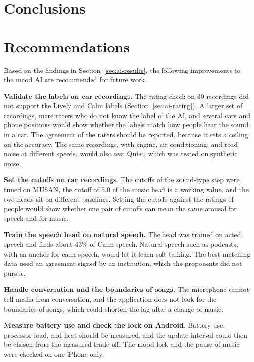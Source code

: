 \section{Conclusions}

\section{Recommendations}
\label{sec:recs}
Based on the findings in Section~\ref{sec:ai-results}, the following improvements to the mood AI are recommended for future work.

\textbf{Validate the labels on car recordings.} The rating check on 30 recordings did not support the Lively and Calm labels (Section~\ref{sec:ai-rating}). A larger set of recordings, more raters who do not know the label of the AI, and several cars and phone positions would show whether the labels match how people hear the sound in a car. The agreement of the raters should be reported, because it sets a ceiling on the accuracy. The same recordings, with engine, air-conditioning, and road noise at different speeds, would also test Quiet, which was tested on synthetic noise.

\textbf{Set the cutoffs on car recordings.} The cutoffs of the sound-type step were tuned on MUSAN, the cutoff of 5.0 of the music head is a working value, and the two heads sit on different baselines. Setting the cutoffs against the ratings of people would show whether one pair of cutoffs can mean the same arousal for speech and for music.

\textbf{Train the speech head on natural speech.} The head was trained on acted speech and finds about 43\% of Calm speech. Natural speech such as podcasts, with an anchor for calm speech, would let it learn soft talking. The best-matching data need an agreement signed by an institution, which the proponents did not pursue.

\textbf{Handle conversation and the boundaries of songs.} The microphone cannot tell media from conversation, and the application does not look for the boundaries of songs, which could shorten the lag after a change of music.

\textbf{Measure battery use and check the lock on Android.} Battery use, processor load, and heat should be measured, and the update interval could then be chosen from the measured trade-off. The mood lock and the pause of music were checked on one iPhone only.

